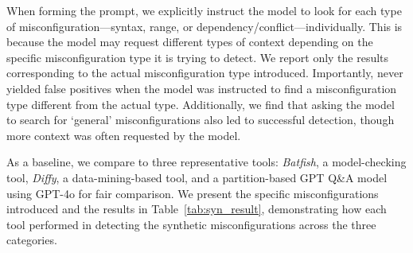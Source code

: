 When forming the prompt, we explicitly instruct the model to look for each type of misconfiguration—syntax, range, or dependency/conflict—individually. This is because the model may request different types of context depending on the specific misconfiguration type it is trying to detect. We report only the results corresponding to the actual misconfiguration type introduced. Importantly, \sysname{} never yielded false positives when the model was instructed to find a misconfiguration type different from the actual type. Additionally, we find that asking the model to search for `general' misconfigurations also led to successful detection, though more context was often requested by the model.

As a baseline, we compare \sysname{} to three representative tools: \textit{Batfish}, a model-checking tool, \textit{Diffy}, a data-mining-based tool, and a partition-based GPT Q\&A model using GPT-4o for fair comparison. We present the specific misconfigurations introduced and the results in Table~\ref{tab:syn_result}, demonstrating how each tool performed in detecting the synthetic misconfigurations across the three categories.

\begin{table}[ht]
\centering
\caption{Number of Cases Detected, Comparative Analysis of Synthetic Misconfiguration Detection Across Tools}
\end{table}


